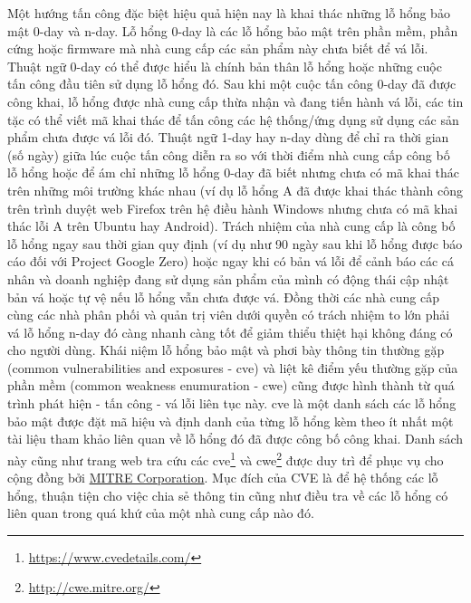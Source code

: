 Một hướng tấn công đặc biệt hiệu quả hiện nay là khai thác những lỗ hổng bảo mật 0-day và n-day. Lỗ hổng 0-day là các lỗ hổng bảo mật trên phần mềm, phần cứng hoặc firmware mà nhà cung cấp các sản phẩm này chưa biết để vá lỗi. Thuật ngữ 0-day có thể được hiểu là chính bản thân lỗ hổng hoặc những cuộc tấn công đầu tiên sử dụng lỗ hổng đó. Sau khi một cuộc tấn công 0-day đã được công khai, lỗ hổng được nhà cung cấp thừa nhận và đang tiến hành vá lỗi, các tin tặc có thể viết mã khai thác để tấn công các hệ thống/ứng dụng sử dụng các sản phẩm chưa được vá lỗi đó. Thuật ngữ 1-day hay n-day dùng để chỉ ra thời gian (số ngày) giữa lúc cuộc tấn công diễn ra so với thời điểm nhà cung cấp công bố lỗ hổng hoặc để ám chỉ những lỗ hổng 0-day đã biết nhưng chưa có mã khai thác trên những môi trường khác nhau (ví dụ lỗ hổng A đã được khai thác thành công trên trình duyệt web Firefox trên hệ điều hành Windows nhưng chưa có mã khai thác lỗi A trên Ubuntu hay Android). Trách nhiệm của nhà cung cấp là công bố lỗ hổng ngay sau thời gian quy định (ví dụ như 90 ngày sau khi lỗ hổng được báo cáo đối với Project Google Zero) hoặc ngay khi có bản vá lỗi để cảnh báo các cá nhân và doanh nghiệp đang sử dụng sản phẩm của mình có động thái cập nhật bản vá hoặc tự vệ nếu lỗ hổng vẫn chưa được vá. Đồng thời các nhà cung cấp cùng các nhà phân phối và quản trị viên dưới quyền có trách nhiệm to lớn phải vá lỗ hổng n-day đó càng nhanh càng tốt để giảm thiểu thiệt hại không đáng có cho người dùng. Khái niệm lỗ hổng bảo mật và phơi bày thông tin thường gặp (common vulnerabilities and exposures - \acrshort{cve}) và liệt kê điểm yếu thường gặp của phần mềm (common weakness enumuration - \acrshort{cwe}) cũng được hình thành từ quá trình phát hiện - tấn công - vá lỗi liên tục này. \acrshort{cve} là một danh sách các lỗ hổng bảo mật được đặt mã hiệu và định danh của từng lỗ hổng kèm theo ít nhất một tài liệu tham khảo liên quan về lỗ hổng đó đã được công bố công khai. Danh sách này cũng như trang web tra cứu các \acrshort{cve}\footnote{\href{https://www.cvedetails.com/}{https://www.cvedetails.com/}} và \acrshort{cwe}\footnote{\href{http://cwe.mitre.org/}{http://cwe.mitre.org/}} được duy trì để phục vụ cho cộng đồng bởi \href{http://cve.mitre.org/}{MITRE Corporation}. Mục đích của CVE là để hệ thống các lỗ hổng, thuận tiện cho việc chia sẻ thông tin cũng như điều tra về các lỗ hổng có liên quan trong quá khứ của một nhà cung cấp nào đó. \par
